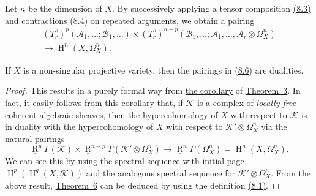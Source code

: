 \documentclass{article}
\theoremstyle{plain}
\newenvironment{theorem}[1]
  {\renewcommand\theinnertheorem{#1}\innertheorem}
  {\endinnertheorem}
\theoremstyle{definition}
\newcommand{\scr}[1]{{\mathscr{#1}}}
\DeclareMathOperator{\RR}{R}
\DeclareMathOperator{\HH}{H}
\begin{document}
Let $n$ be the dimension of $X$.
By successively applying a tensor composition \hyperref[8.3]{(8.3)} and contractions \hyperref[8.4]{(8.4)} on repeated arguments, we obtain a pairing
\[
\label{8.6}
  \begin{gathered}
    (T_r^s)^p(\scr{A}_1,\ldots;\scr{B}_1,\ldots)
    \times (T_r^s)^{n-p}(\scr{B}_1,\ldots;\scr{A}_1,\ldots,\scr{A}_r\otimes\Omega_X^n)
  \\\longrightarrow\HH^n(X,\Omega_X^n).
  \end{gathered}
\tag{8.6}
\]

\begin{theorem}{6}
\label{theorem6}
  If $X$ is a non-singular projective variety, then the pairings in \hyperref[8.6]{(8.6)} are dualities.
\end{theorem}

\begin{proof}
  This results in a purely formal way from \hyperref[theorem3corollary]{the corollary} of \hyperref[theorem3]{Theorem~3}.
  In fact, it easily follows from this corollary that, if $\scr{K}$ is a complex of \emph{locally-free} coherent algebraic sheaves, then the hypercohomology of $X$ with respect to $\scr{K}$ is in duality with the hypercohomology of $X$ with respect to $\scr{K}'\otimes\Omega_X^n$ via the natural pairings
  \[
  \label{8.7}
    \underline{\RR}^p\Gamma(\scr{K})
    \times \underline{\RR}^{n-p}\Gamma(\scr{K}'\otimes\Omega_X^n)
    \to \underline{\RR}^n\Gamma(\Omega_X^n)
    = \HH^n(X,\Omega_X^n).
  \tag{8.7}
  \]
  We can see this by using the spectral sequence with initial page $\HH^p(\HH^q(X,\scr{K}))$ and the analogous spectral sequence for $\scr{K}'\otimes\Omega_X^n$.
  From the above result, \hyperref[theorem6]{Theorem~6} can be deduced by using the definition \hyperref[8.1]{(8.1)}.
\end{proof}
\end{document}
